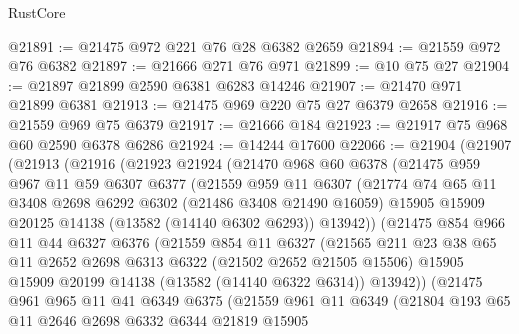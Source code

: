 \begin{lexlean}{RustCore}
\begin{coremodule}
@21891 := @21475 @972 @221 @76 @28 @6382 @2659
@21894 := @21559 @972 @76 @6382
@21897 := @21666 @271 @76 @971
@21899 := @10 @75 @27
@21904 := @21897 @21899 @2590 @6381 @6283 @14246
@21907 := @21470 @971 @21899 @6381
@21913 := @21475 @969 @220 @75 @27 @6379 @2658
@21916 := @21559 @969 @75 @6379
@21917 := @21666 @184
@21923 := @21917 @75 @968 @60 @2590 @6378 @6286
@21924 := @14244 @17600
@22066 := @21904
    (@21907
      (@21913
        (@21916
          (@21923
            @21924
            (@21470
              @968
              @60
              @6378
              (@21475
                @959
                @967
                @11
                @59
                @6307
                @6377
                (@21559
                  @959
                  @11
                  @6307
                  (@21774
                    @74
                    @65
                    @11
                    @3408
                    @2698
                    @6292
                    @6302
                    (@21486 @3408 @21490 @16059)
                    @15905
                    @15909
                    @20125
                    @14138
                    (@13582 (@14140 @6302 @6293))
                    @13942))
                (@21475
                  @854
                  @966
                  @11
                  @44
                  @6327
                  @6376
                  (@21559
                    @854
                    @11
                    @6327
                    (@21565
                      @211
                      @23
                      @38
                      @65
                      @11
                      @2652
                      @2698
                      @6313
                      @6322
                      (@21502 @2652 @21505 @15506)
                      @15905
                      @15909
                      @20199
                      @14138
                      (@13582 (@14140 @6322 @6314))
                      @13942))
                  (@21475
                    @961
                    @965
                    @11
                    @41
                    @6349
                    @6375
                    (@21559
                      @961
                      @11
                      @6349
                      (@21804
                        @193
                        @65
                        @11
                        @2646
                        @2698
                        @6332
                        @6344
                        @21819
                        @15905

\end{coremodule}
\end{lexlean}
